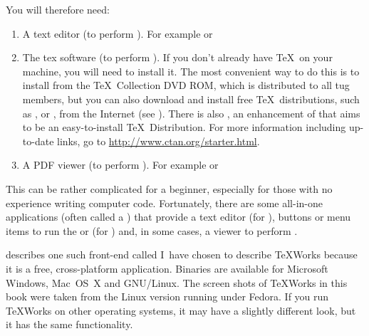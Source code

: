 You will therefore need:

\begin{enumerate}
\item A text editor  (to perform ). For
example  
 or

\label{obj:MiKTeX}%
\item The \gls{tex} software (to perform ). If
you don't already have \TeX\ on your machine, you will need to
install it. The most convenient way to do this is
to install from the \TeX\ Collection DVD ROM, which is distributed
to all \gls{tug} members, but you can also download and install free
\TeX\ distributions, such as ,
 or , from the Internet (see
).  There is also ,
an enhancement of  that aims to be an
easy-to-install \TeX\ Distribution.  For more information including
up-to-date links, go to \url{http://www.ctan.org/starter.html}.

\item A PDF viewer (to perform
). For example 
 or

\end{enumerate}

This can be rather complicated for a beginner, especially for those
with no experience writing computer code. Fortunately, there are
some all-in-one applications (often called a )
that provide a text editor (for ),
buttons or menu items to run the  or
  (for
) and, in some cases, a viewer to perform
.

 describes one such front-end called
 I~have chosen
to describe TeXWorks because it is a free, cross-platform
application. Binaries are available for Microsoft Windows, Mac~OS~X
and GNU/Linux. The screen shots of TeXWorks in this
book were taken from the Linux version running
under Fedora. If you run TeXWorks on other operating systems, it may
have a slightly different look, but it has the same functionality.

